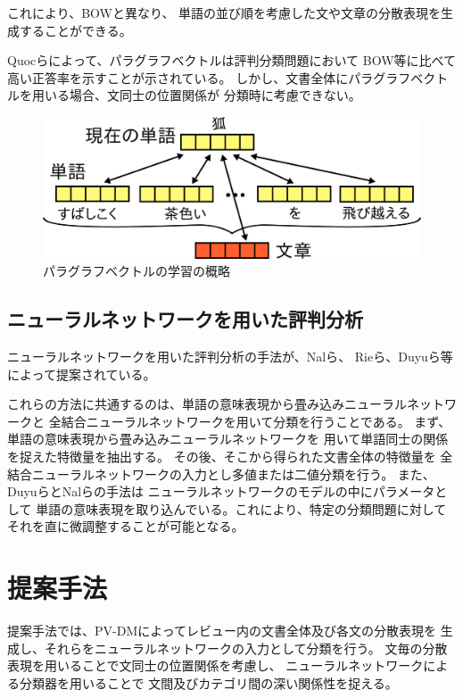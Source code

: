 \documentclass[twocolumn,a4paper]{ltjarticle}
\makeatletter
\let\tti@includegraphics\includegraphics
\renewcommand{\includegraphics}[1]{%
    \tti@includegraphics[width=\linewidth]{#1}}
\makeatother
\begin{document}
これにより、BOWと異なり、
単語の並び順を考慮した文や文章の分散表現を生成することができる。

Quocら\cite{quoc14}によって、パラグラフベクトルは評判分類問題において
BOW等に比べて高い正答率を示すことが示されている。
しかし、文書全体にパラグラフベクトルを用いる場合、文同士の位置関係が
分類時に考慮できない。

\begin{figure}[t]
  \includegraphics{fig/paragraph_vector.png}
  \caption{パラグラフベクトルの学習の概略}
  \label{fig:ParagraphVector}
\end{figure}


\subsection{ニューラルネットワークを用いた評判分析}

ニューラルネットワークを用いた評判分析の手法が、Nalら\cite{nal14}、
Rieら\cite{rie14}、Duyuら\cite{duyu15}等によって提案されている。

これらの方法に共通するのは、単語の意味表現から畳み込みニューラルネットワークと
全結合ニューラルネットワークを用いて分類を行うことである。
まず、単語の意味表現から畳み込みニューラルネットワークを
用いて単語同士の関係を捉えた特徴量を抽出する。
その後、そこから得られた文書全体の特徴量を
全結合ニューラルネットワークの入力とし多値または二値分類を行う。
また、Duyuら\cite{duyu15}とNalら\cite{nal14}の手法は
ニューラルネットワークのモデルの中にパラメータとして
単語の意味表現を取り込んでいる。これにより、特定の分類問題に対して
それを直に微調整することが可能となる。



\section{提案手法}

提案手法では、PV-DMによってレビュー内の文書全体及び各文の分散表現を
生成し、それらをニューラルネットワークの入力として分類を行う。
文毎の分散表現を用いることで文同士の位置関係を考慮し、
ニューラルネットワークによる分類器を用いることで
文間及びカテゴリ間の深い関係性を捉える。
\end{document}
